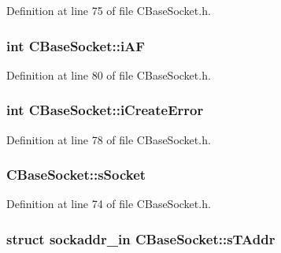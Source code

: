 \-Definition at line 75 of file \-C\-Base\-Socket.\-h.

\hypertarget{class_c_base_socket_a3f75df97cb5664473c77ec1b323d3407}{
\subsubsection[{i\-A\-F}]{\setlength{\rightskip}{0pt plus 5cm}int {\bf \-C\-Base\-Socket\-::i\-A\-F}}}\label{class_c_base_socket_a3f75df97cb5664473c77ec1b323d3407}


\-Definition at line 80 of file \-C\-Base\-Socket.\-h.

\hypertarget{class_c_base_socket_a534d73ca9c9a1a0cd4767efb3b1d0566}{
\subsubsection[{i\-Create\-Error}]{\setlength{\rightskip}{0pt plus 5cm}int {\bf \-C\-Base\-Socket\-::i\-Create\-Error}}}\label{class_c_base_socket_a534d73ca9c9a1a0cd4767efb3b1d0566}


\-Definition at line 78 of file \-C\-Base\-Socket.\-h.

\hypertarget{class_c_base_socket_a4a40d0e510e311d365681f3af20738b8}{
\subsubsection[{s\-Socket}]{ {\bf \-C\-Base\-Socket\-::s\-Socket}}}\label{class_c_base_socket_a4a40d0e510e311d365681f3af20738b8}


\-Definition at line 74 of file \-C\-Base\-Socket.\-h.

\hypertarget{class_c_base_socket_af5f07d3684a2c7876b617885f91a518d}{
\subsubsection[{s\-T\-Addr}]{\setlength{\rightskip}{0pt plus 5cm}struct sockaddr\-\_\-in {\bf \-C\-Base\-Socket\-::s\-T\-Addr}}}\label{class_c_base_socket_af5f07d3684a2c7876b617885f91a518d}


